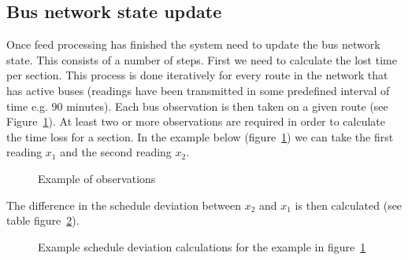 \subsection{Bus network state update}
Once feed processing has finished the system need to update the bus network state. This consists of a number of steps. First we need to calculate the lost time per section. This process is done iteratively for every route in the network that has active buses (readings have been transmitted in some predefined interval of time e.g. 90 minutes). Each bus observation is then taken on a given route (see Figure~\ref{fig:example1}). At least two or more observations are required in order to calculate the time loss for a section. In the example below (figure~\ref{fig:example1}) we can take the first reading $x_1$ and the second reading $x_2$.
\begin{figure}[ht]
	\caption{Example of observations}
	\label{fig:example1}
\end{figure}
The difference in the schedule deviation between $x_2$ and $x_1$ is then calculated (see table figure~\ref{fig:example1Table}). 
\begin{figure}[ht]
	\caption{Example schedule deviation calculations for the example in figure~\ref{fig:example1}}
	\label{fig:example1Table}
\end{figure}

